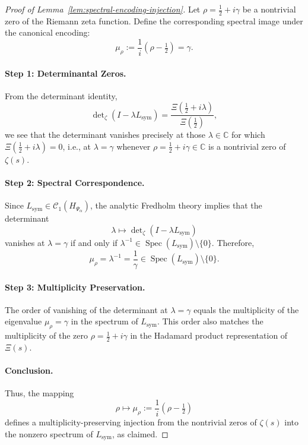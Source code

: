 \begin{proof}[Proof of Lemma~\ref{lem:spectral-encoding-injection}]
Let \( \rho = \tfrac{1}{2} + i\gamma \) be a nontrivial zero of the Riemann zeta function. Define the corresponding spectral image under the canonical encoding:
\[
\mu_\rho := \frac{1}{i}(\rho - \tfrac{1}{2}) = \gamma.
\]

\paragraph{Step 1: Determinantal Zeros.}
From the determinant identity,
\[
\det\nolimits_{\zeta}(I - \lambda L_{\mathrm{sym}}) = \frac{\Xi(\tfrac{1}{2} + i\lambda)}{\Xi(\tfrac{1}{2})},
\]
we see that the determinant vanishes precisely at those \( \lambda \in \mathbb{C} \) for which \( \Xi(\tfrac{1}{2} + i\lambda) = 0 \), i.e., at \( \lambda = \gamma \) whenever \( \rho = \tfrac{1}{2} + i\gamma \in \mathbb{C} \) is a nontrivial zero of \( \zeta(s) \).

\paragraph{Step 2: Spectral Correspondence.}
Since \( L_{\mathrm{sym}} \in \mathcal{C}_1(H_{\Psi_\alpha}) \), the analytic Fredholm theory implies that the determinant
\[
\lambda \mapsto \det\nolimits_{\zeta}(I - \lambda L_{\mathrm{sym}})
\]
vanishes at \( \lambda = \gamma \) if and only if \( \lambda^{-1} \in \operatorname{Spec}(L_{\mathrm{sym}}) \setminus \{0\} \). Therefore,
\[
\mu_\rho = \lambda^{-1} = \frac{1}{\gamma} \in \operatorname{Spec}(L_{\mathrm{sym}}) \setminus \{0\}.
\]

\paragraph{Step 3: Multiplicity Preservation.}
The order of vanishing of the determinant at \( \lambda = \gamma \) equals the multiplicity of the eigenvalue \( \mu_\rho = \gamma \) in the spectrum of \( L_{\mathrm{sym}} \). This order also matches the multiplicity of the zero \( \rho = \tfrac{1}{2} + i\gamma \) in the Hadamard product representation of \( \Xi(s) \).

\paragraph{Conclusion.}
Thus, the mapping
\[
\rho \mapsto \mu_\rho := \frac{1}{i}(\rho - \tfrac{1}{2})
\]
defines a multiplicity-preserving injection from the nontrivial zeros of \( \zeta(s) \) into the nonzero spectrum of \( L_{\mathrm{sym}} \), as claimed.
\end{proof}
